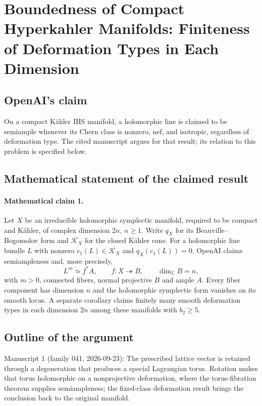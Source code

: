 \documentclass[11pt]{article}
\begin{document}
\section*{Boundedness of Compact Hyperkahler Manifolds: Finiteness of Deformation Types in Each Dimension}

\subsection{OpenAI's claim}
On a compact Kähler IHS manifold, a holomorphic line is claimed to be semiample whenever its Chern class is nonzero, nef, and isotropic, regardless of deformation type. The cited manuscript argues for that result; its relation to this problem is specified below.

\subsection{Mathematical statement of the claimed result}
\paragraph{Mathematical claim 1.} Let $X$ be an irreducible holomorphic symplectic manifold, required to be compact and Kähler, of complex dimension $2n$, $n\ge1$. Write $q_X$ for its Beauville--Bogomolov form and $\overline{\mathcal K_X}$ for the closed Kähler cone. For a holomorphic line bundle $L$ with nonzero $c_1(L)\in\overline{\mathcal K_X}$ and $q_X(c_1(L))=0$, OpenAI claims semiampleness and, more precisely,
\[
L^m\simeq f^*A,\qquad f:X\twoheadrightarrow B,\qquad\dim_{\mathbb C}B=n,
\]
with $m>0$, connected fibers, normal projective $B$ and ample $A$. Every fiber component has dimension $n$ and the holomorphic symplectic form vanishes on its smooth locus. A separate corollary claims finitely many smooth deformation types in each dimension $2n$ among these manifolds with $b_2\ge5$.

\subsection{Outline of the argument}
Manuscript 1 (family 041, 2026-09-23): The prescribed lattice vector is retained through a degeneration that produces a special Lagrangian torus. Rotation makes that torus holomorphic on a nonprojective deformation, where the torus-fibration theorem supplies semiampleness; the fixed-class deformation result brings the conclusion back to the original manifold.
\end{document}
